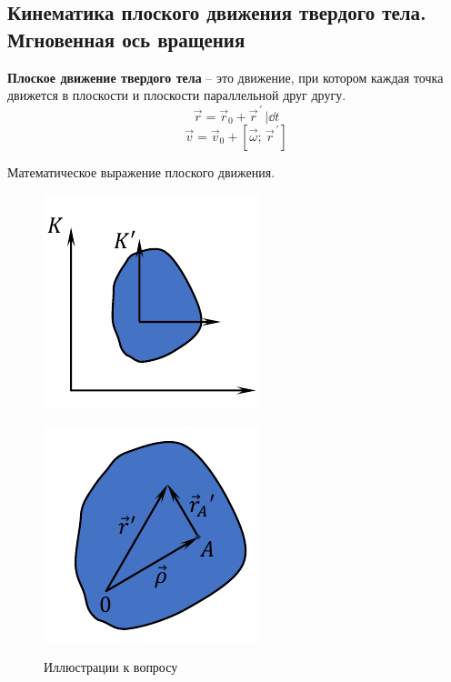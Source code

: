 \subsection{Кинематика плоского движения твердого тела. Мгновенная ось вращения}

\textbf{Плоское движение твердого тела} -- это движение, при котором каждая точка движется в плоскости и плоскости параллельной друг другу.
\[\vec{r} = \vec{r}_0 + \vec{r}^{\,\prime} \, \Big| \dd{}{t}\]
\[\boxed{\vec{v} = \vec{v}_0 + [\vec{\omega}; \, \vec{r}^{\,\prime}]}\]
\begin{center}
	Математическое выражение плоского движения.
\end{center}
\begin{figure}[h]
	\centering
	\begin{minipage}{0.49\linewidth}
		\centering
		\includegraphics[width=0.6\linewidth]{image/Кинематика Плоского Движения.pdf}
		\subcaption{ }
		\label{fig:12.1.1}
	\end{minipage}
	\hfill
	\begin{minipage}{0.49\linewidth}
		\centering
		\includegraphics[width=0.6\linewidth]{image/Кинематика Плоского Движения 1.pdf}
		\subcaption{ }
		\label{fig:12.1.2}
	\end{minipage}
	\caption{Иллюстрации к вопросу}
	\label{fig:5}
\end{figure}

